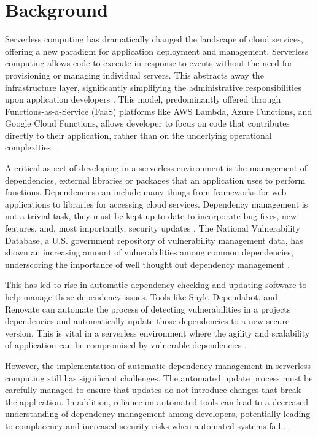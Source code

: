 \documentclass[12pt, letterpaper]{article}
\begin{document}
\section{Background}
Serverless computing has dramatically changed the landscape of cloud services, offering a new paradigm for application deployment and management. Serverless computing allows code to execute in response to events without the need for provisioning or managing individual servers. This abstracts away the infrastructure layer, significantly simplifying the administrative responsibilities upon application developers \cite{roberts2020lambda}. This model, predominantly offered through Functions-as-a-Service (FaaS) platforms like AWS Lambda, Azure Functions, and Google Cloud Functions, allows developer to focus on code that contributes directly to their application, rather than on the underlying operational complexities \cite{villamizar2015evaluating}.

A critical aspect of developing in a serverless environment is the management of dependencies, external libraries or packages that an application uses to perform functions. Dependencies can include many things from frameworks for web applications to libraries for accessing cloud services. Dependency management is not a trivial task, they must be kept up-to-date to incorporate bug fixes, new features, and, most importantly, security updates \cite{benischke2023updates}. The National Vulnerability Database, a U.S. government repository of vulnerability management data, has shown an increasing amount of vulnerabilities among common dependencies, underscoring the importance of well thought out dependency management \cite{NVDdatabase}.

This has led to rise in automatic dependency checking and updating software to help manage these dependency issues. Tools like Snyk, Dependabot, and Renovate can automate the process of detecting vulnerabilities in a projects dependencies and automatically update those dependencies to a new secure version. This is vital in a serverless environment where the agility and scalability of application can be compromised by vulnerable dependencies \cite{estrin2021handbook}. 

However, the implementation of automatic dependency management in serverless computing still has significant challenges. The automated update process must be carefully managed to ensure that updates do not introduce changes that break the application. In addition, reliance on automated tools can lead to a decreased understanding of dependency management among developers, potentially leading to complacency and increased security risks when automated systems fail \cite{hilton2016ci}.
\end{document}
